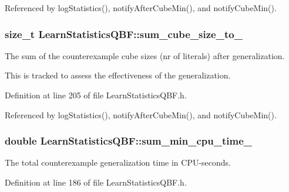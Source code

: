 Referenced by log\-Statistics(), notify\-After\-Cube\-Min(), and notify\-Cube\-Min().

\hypertarget{classLearnStatisticsQBF_a444ff1c70c90edfd87a56790060c0aae}{
\subsubsection[{sum\-\_\-cube\-\_\-size\-\_\-to\-\_\-}]{\setlength{\rightskip}{0pt plus 5cm}size\-\_\-t Learn\-Statistics\-Q\-B\-F\-::sum\-\_\-cube\-\_\-size\-\_\-to\-\_\-\hspace{0.3cm}{\ttfamily [protected]}}}\label{classLearnStatisticsQBF_a444ff1c70c90edfd87a56790060c0aae}


The sum of the counterexample cube sizes (nr of literals) after generalization. 

This is tracked to assess the effectiveness of the generalization. 

Definition at line 205 of file Learn\-Statistics\-Q\-B\-F.\-h.



Referenced by log\-Statistics(), notify\-After\-Cube\-Min(), and notify\-Cube\-Min().

\hypertarget{classLearnStatisticsQBF_a8fcce1bc5593631429c86bd3a1376e86}{
\subsubsection[{sum\-\_\-min\-\_\-cpu\-\_\-time\-\_\-}]{\setlength{\rightskip}{0pt plus 5cm}double Learn\-Statistics\-Q\-B\-F\-::sum\-\_\-min\-\_\-cpu\-\_\-time\-\_\-\hspace{0.3cm}{\ttfamily [protected]}}}\label{classLearnStatisticsQBF_a8fcce1bc5593631429c86bd3a1376e86}


The total counterexample generalization time in C\-P\-U-\/seconds. 



Definition at line 186 of file Learn\-Statistics\-Q\-B\-F.\-h.



